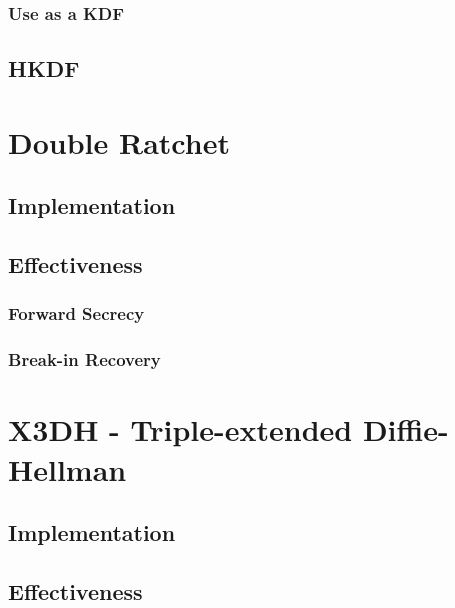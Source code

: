 \subsubsection{Use as a KDF}


\subsection{HKDF}


\section{Double Ratchet}


\subsection{Implementation}


\subsection{Effectiveness}


\subsubsection{Forward Secrecy}


\subsubsection{Break-in Recovery}


\section{X3DH - Triple-extended Diffie-Hellman}


\subsection{Implementation}


\subsection{Effectiveness}




